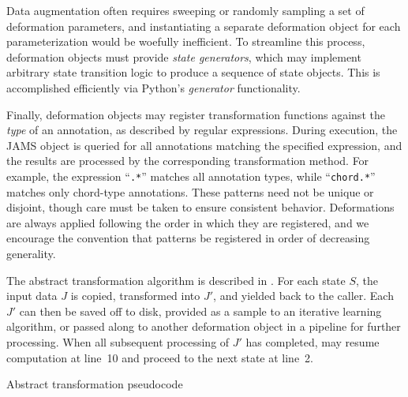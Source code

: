 \documentclass{article}
\begin{document}
Data augmentation often requires sweeping or randomly sampling a set of deformation 
parameters, and instantiating a separate deformation object for each parameterization 
would be woefully inefficient.
To streamline this process, deformation objects must provide \emph{state generators},
which may implement arbitrary state transition logic to produce a sequence of 
state objects.  This is accomplished efficiently via Python's \emph{generator}
functionality.

Finally, deformation objects may register transformation functions against the 
\emph{type} of an annotation, as described by regular expressions.
During execution, the JAMS object is queried for all annotations matching the specified
expression, and the results are processed by the corresponding transformation method.
For example, the expression ``\texttt{.*}'' matches all annotation types, while 
``\texttt{chord.*}'' matches only chord-type annotations.
These patterns need not be unique or disjoint, though care must be taken
to ensure consistent behavior.
Deformations are always applied following the order in which they are registered, 
and we encourage the convention that patterns be registered in order of decreasing
generality.

The abstract transformation algorithm is described in .
For each state $S$, the input data $J$ is copied, transformed into $J'$, and yielded 
back to the caller. 
Each $J'$ can then be saved off to disk, provided as a sample to an iterative learning 
algorithm, or passed along to another deformation object in a pipeline for further processing.
When all subsequent processing of $J'$ has completed,  may resume
computation at line~10 and proceed to the next state at line~2.

\begin{algorithm}[t]
\caption{Abstract transformation pseudocode\label{alg:transformation}}
\begin{algorithmic}[1]
            \EndFor{}
        \EndFor{}
    \EndFor{}
    \EndFunction{}
\end{algorithmic}
\end{algorithm}
\end{document}
